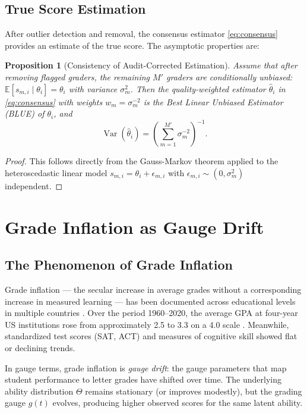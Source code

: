 \documentclass[12pt,a4paper]{article}
\newtheorem{proposition}[theorem]{Proposition}
\theoremstyle{remark}
\DeclareMathOperator{\Var}{Var}
\begin{document}
\subsection{True Score Estimation}

After outlier detection and removal, the consensus estimator \eqref{eq:consensus} provides an estimate of the true score. The asymptotic properties are:

\begin{proposition}[Consistency of Audit-Corrected Estimation]
\label{prop:consistency}
Assume that after removing flagged graders, the remaining $M'$ graders are conditionally unbiased: $\mathbb{E}[s_{m,i} \mid \theta_i] = \theta_i$ with variance $\sigma_m^2$. Then the quality-weighted estimator $\hat{\theta}_i$ in \eqref{eq:consensus} with weights $w_m = \sigma_m^{-2}$ is the Best Linear Unbiased Estimator (BLUE) of $\theta_i$, and
\begin{equation}
\Var(\hat{\theta}_i) = \left( \sum_{m=1}^{M'} \sigma_m^{-2} \right)^{-1}.
\label{eq:blue_var}
\end{equation}
\end{proposition}

\begin{proof}
This follows directly from the Gauss-Markov theorem \cite{gauss1821} applied to the heteroscedastic linear model $s_{m,i} = \theta_i + \epsilon_{m,i}$ with $\epsilon_{m,i} \sim (0, \sigma_m^2)$ independent.
\end{proof}

\section{Grade Inflation as Gauge Drift}

\subsection{The Phenomenon of Grade Inflation}

Grade inflation --- the secular increase in average grades without a corresponding increase in measured learning --- has been documented across educational levels in multiple countries \cite{rumberger2008, pattison2010, jewell2013}. Over the period 1960--2020, the average GPA at four-year US institutions rose from approximately 2.5 to 3.3 on a 4.0 scale \cite{roistaczer2012}. Meanwhile, standardized test scores (SAT, ACT) and measures of cognitive skill showed flat or declining trends.

In gauge terms, grade inflation is \emph{gauge drift}: the gauge parameters that map student performance to letter grades have shifted over time. The underlying ability distribution $\Theta$ remains stationary (or improves modestly), but the grading gauge $g(t)$ evolves, producing higher observed scores for the same latent ability.
\end{document}
